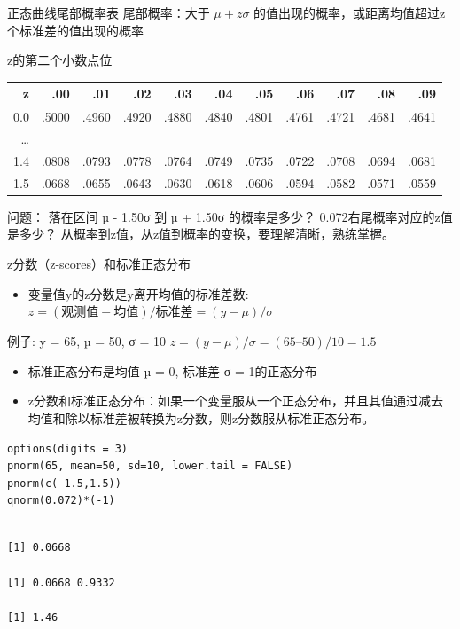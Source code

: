 \documentclass[presentation]{beamer}
\begin{document}
\begin{frame}[label={sec:org1601997}]{正态曲线尾部概率表}
尾部概率：大于 \(\mu + z\sigma\) 的值出现的概率，或距离均值超过z个标准差的值出现的概率  

z的第二个小数点位

\begin{center}
\begin{tabular}{rrrrrrrrrrr}
z & .00 & .01 & .02 & .03 & .04 & .05 & .06 & .07 & .08 & .09\\
\hline
0.0 & .5000 & .4960 & .4920 & .4880 & .4840 & .4801 & .4761 & .4721 & .4681 & .4641\\
\ldots{} &  &  &  &  &  &  &  &  &  & \\
1.4 & .0808 & .0793 & .0778 & .0764 & .0749 & .0735 & .0722 & .0708 & .0694 & .0681\\
1.5 & .0668 & .0655 & .0643 & .0630 & .0618 & .0606 & .0594 & .0582 & .0571 & .0559\\
\end{tabular}
\end{center}

问题： 落在区间 µ - 1.50σ 到  µ + 1.50σ 的概率是多少？ 0.072右尾概率对应的z值是多少？  
\alert{\alert{从概率到z值，从z值到概率的变换，要理解清晰，熟练掌握。}}
\end{frame}

\begin{frame}[fragile,label={sec:org47c8145}]{z分数（z-scores）和标准正态分布}
 \begin{itemize}
\item 变量值y的z分数是y离开均值的标准差数: \(z = (观测值-均值)/ 标准差 = (y - \mu )/\sigma\)
\end{itemize}
例子:    y = 65, µ = 50, σ = 10 \(z = (y - \mu)/\sigma = (65 – 50)/10 = 1.5\)  

\begin{itemize}
\item 标准正态分布是均值 µ = 0, 标准差 σ = 1的正态分布

\item z分数和标准正态分布：如果一个变量服从一个正态分布，并且其值通过减去均值和除以标准差被转换为z分数，则z分数服从标准正态分布。
\end{itemize}
\begin{verbatim}
options(digits = 3)
pnorm(65, mean=50, sd=10, lower.tail = FALSE)
pnorm(c(-1.5,1.5))
qnorm(0.072)*(-1)
\end{verbatim}

\begin{verbatim}

[1] 0.0668

[1] 0.0668 0.9332

[1] 1.46
\end{verbatim}
\end{frame}
\end{document}
